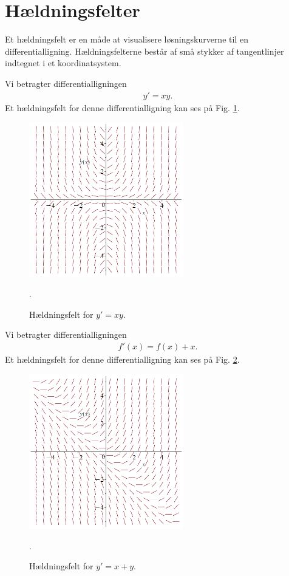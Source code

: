 \section*{Hældningsfelter}
Et hældningsfelt er en måde at visualisere løsningskurverne til en differentialligning. Hældningsfelterne består af små stykker af tangentlinjer indtegnet i et koordinatsystem. 
\begin{exa}
	Vi betragter differentialligningen
	\begin{align*}
		y' = xy.
	\end{align*}
	Et hældningsfelt for denne differentialligning kan ses på Fig. \ref{fig:hel1}.
	\begin{figure}[H]
		\centering
		\includegraphics[width=0.6\textwidth]{Billeder/xyhf.png}
		\caption{Hældningsfelt for $y' = xy$.}
		\label{fig:hel1}.
	\end{figure}
\end{exa}

\begin{exa}
	Vi betragter differentialligningen 
	\begin{align*}
		f'(x) = f(x)+x.
	\end{align*}
	Et hældningsfelt for denne differentialligning kan ses på Fig. \ref{fig:hel2}.
	\begin{figure}[H]
		\centering
		\includegraphics[width=0.6\textwidth]{Billeder/xpyhf.png}
		\caption{Hældningsfelt for $y' = x+y$.}
		\label{fig:hel2}.
	\end{figure}
\end{exa}

